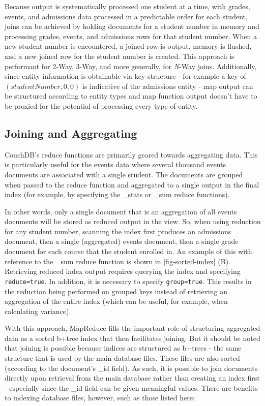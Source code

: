 Because output is systematically processed one student at a time, with grades, events, and admissions data processed in a predictable order for each student, joins can be achieved by holding documents for a student number in memory and processing grades, events, and admissions rows for that student number. When a new student number is encountered, a joined row is output, memory is flushed, and a new joined row for the student number is created. This approach is performant for 2-Way, 3-Way, and more generally, for \textit{N}-Way joins. Additionally, since entity information is obtainable via key-structure - for example a key of $(studentNumber,0,0)$ is indicative of the admissions entity - map output can be structured according to entity types and map function output doesn’t have to be proxied for the potential of processing every type of entity.

\subsection{Joining and Aggregating}
CouchDB's reduce functions are primarily geared towards aggregating data. This is particularly useful for the events data where several thousand events documents are associated with a single student. The documents are grouped when passed to the reduce function and aggregated to a single output in the final index (for example, by specifying the \_stats or \_sum reduce functions).

In other words, only a single document that is an aggregation of all events documents will be stored as reduced output in the view. So, when using reduction for any student number, scanning the index first produces an admissions document, then a single (aggregated) events document, then a single grade document for each course that the student enrolled in. An example of this with reference to the \_sum reduce function is shown in \ref{fig-sorted-index} (B). Retrieving reduced index output requires querying the index and specifying \texttt{reduce=true}. In addition, it is necessary to specify \texttt{group=true}. This results in the reduction being performed on grouped keys instead of retrieving an aggregation of the entire index (which can be useful, for example, when calculating variance).



With this approach, MapReduce fills the important role of structuring aggregated data as a sorted b+tree index that then facilitates joining. But it should be noted that joining is possible because indices are structured as b+trees - the same structure that is used by the main database files. These files are also sorted (according to the document’s \_id field). As such, it is possible to join documents directly upon retrieval from the main database rather than creating an index first - especially since the \_id field can be given meaningful values. There are benefits to indexing database files, however, such as those listed here:

